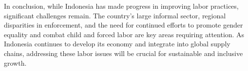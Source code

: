 In conclusion, while Indonesia has made progress in improving labor practices, significant challenges remain. The country's large informal sector, regional disparities in enforcement, and the need for continued efforts to promote gender equality and combat child and forced labor are key areas requiring attention. As Indonesia continues to develop its economy and integrate into global supply chains, addressing these labor issues will be crucial for sustainable and inclusive growth.